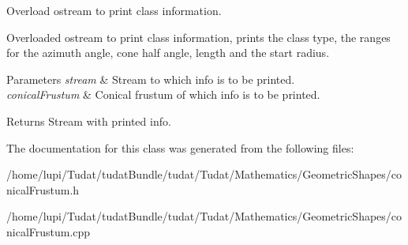 Overload ostream to print class information. 

Overloaded ostream to print class information, prints the class type, the ranges for the azimuth angle, cone half angle, length and the start radius. 
\begin{DoxyParams}{Parameters}
{\em stream} & Stream to which info is to be printed. \\
\hline
{\em conical\+Frustum} & Conical frustum of which info is to be printed. \\
\hline
\end{DoxyParams}
\begin{DoxyReturn}{Returns}
Stream with printed info. 
\end{DoxyReturn}


The documentation for this class was generated from the following files\+:\begin{DoxyCompactItemize}
\item 
/home/lupi/\+Tudat/tudat\+Bundle/tudat/\+Tudat/\+Mathematics/\+Geometric\+Shapes/conical\+Frustum.\+h\item 
/home/lupi/\+Tudat/tudat\+Bundle/tudat/\+Tudat/\+Mathematics/\+Geometric\+Shapes/conical\+Frustum.\+cpp\end{DoxyCompactItemize}
